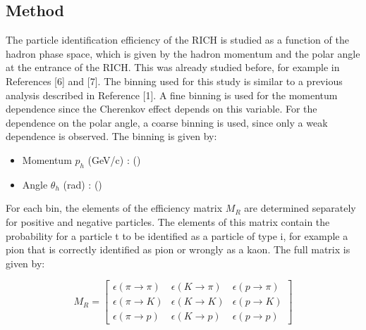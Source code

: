\subsection{Method}

The particle identification efficiency of the RICH is studied as a function of the hadron phase space, which is given by the hadron momentum and the polar angle at the
entrance of the RICH. This was already studied before, for example in References [6] and [7]. The binning used for this study is similar to a previous analysis described
in Reference [1]. A fine binning is used for the momentum dependence since the Cherenkov effect depends on this variable. For the dependence on the polar angle, a coarse
binning is used, since only a weak dependence is observed. The binning is given by:

\begin{itemize}
  \item Momentum $p_h$ (GeV/c) : ()
  \item Angle $\theta_h$ (rad) : ()
\end{itemize}

For each bin, the elements of the efficiency matrix $M_R$ are determined separately for positive and negative particles. The elements of this matrix contain the probability
for a particle t to be identified as a particle of type i, for example a pion that is correctly identified as pion or wrongly as a kaon. The full matrix is given by:

\begin{equation}
  M_R
  =
  \begin{bmatrix}
  \epsilon(\pi \rightarrow \pi) & \epsilon(K \rightarrow \pi) & \epsilon(p \rightarrow \pi)\\
  \epsilon(\pi \rightarrow K) & \epsilon(K \rightarrow K) & \epsilon(p \rightarrow K) \\
  \epsilon(\pi \rightarrow p) & \epsilon(K \rightarrow p) & \epsilon(p \rightarrow p)
  \end{bmatrix}
\end{equation}

